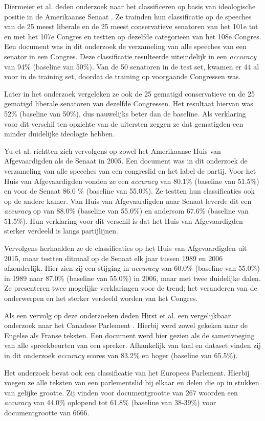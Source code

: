 Diermeier et al. deden onderzoek naar het classificeren op basis van ideologische positie in de Amerikaanse Senaat \cite{diermeier_godbout_yu_kaufmann_2012}. Ze trainden hun classificatie op de speeches van de 25 meest liberale en de 25 meest conservatieve senatoren van het 101e tot en met het 107e Congres en testten op dezelfde categorieën van het 108e Congres. Een document was in dit onderzoek de verzameling van alle speeches van een senator in een Congres. Deze classificatie resulteerde uiteindelijk in een \textit{accuracy} van 94\% (baseline van 50\%). Van de 50 senatoren in de test set, kwamen er 44 al voor in de training set, doordat de training op voorgaande Congressen was.\par
Later in het onderzoek vergeleken ze ook de 25 gematigd conservatieve  en de 25 gematigd liberale senatoren van dezelfde Congressen. Het resultaat hiervan was 52\% (baseline van 50\%), dus nauwelijks beter dan de baseline. Als verklaring voor dit verschil ten opzichte van de uitersten zeggen ze dat gematigden een minder duidelijke ideologie hebben.\par
Yu et al. \cite{doi:10.1080/19331680802149608} richtten zich vervolgens op zowel het Amerikaanse Huis van Afgevaardigden als de Senaat in 2005. Een document was in dit onderzoek de verzameling van alle speeches van een congreslid en het label de partij. Voor het Huis van Afgevaardigden vonden ze een \textit{accuracy} van 80.1\% (baseline van 51.5\%) en voor de Senaat 86.0 \% (baseline van 55.0\%). Ze testten hun classificaties ook op de andere kamer. Van Huis van Afgevaardigden naar Senaat leverde dit een \textit{accuracy} op van 88.0\% (baseline van 55.0\%) en andersom 67.6\% (baseline van 51.5\%). Hun verklaring voor dit verschil is dat het Huis van Afgevaardigden sterker verdeeld is langs partijlijnen.\par
Vervolgens herhaalden ze de classificaties op het Huis van Afgevaardigden uit 2015, maar testten ditmaal op de Senaat elk jaar tussen 1989 en 2006 afzonderlijk. Hier zien zij een stijging in \textit{accuracy} van 60.0\% (baseline van 55.0\%) in 1989 naar 87.0\% (baseline van 55.0\%) in 2006, maar met twee duidelijke dalen. Ze presenteren twee mogelijke verklaringen voor de trend; het veranderen van de onderwerpen en het sterker verdeeld worden van het Congres. \par
Als een vervolg op deze onderzoeken deden Hirst et al. een vergelijkbaar onderzoek naar het Canadese Parlement \cite{Hirst_textto}. Hierbij werd zowel gekeken naar de Engelse als Franse teksten. Een document werd hier gezien als de samenvoeging van alle spreekbeurten van een spreker. Afhankelijk van taal en dataset vinden zij in dit onderzoek \textit{accuracy} scores van 83.2\%  en hoger (baseline van 65.5\%).\par
Het onderzoek bevat ook een classificatie van het Europees Parlement. Hierbij voegen ze alle teksten van een parlementslid bij elkaar en delen die op in stukken van gelijke grootte. Zij vinden voor documentgrootte van 267 woorden een \textit{accuracy} van 44.0\% oplopend tot 61.8\% (baseline van 38-39\%) voor documentgrootte van 6666.\par

